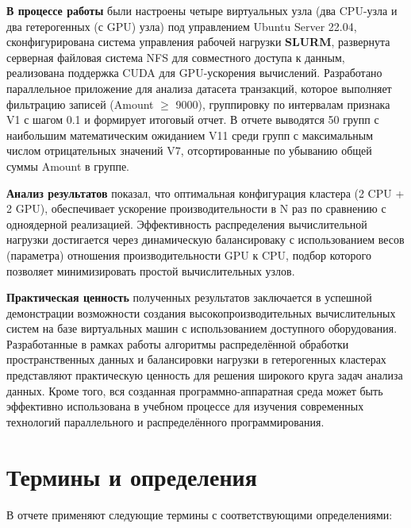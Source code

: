 \documentclass[areaset=advanced]{scrartcl}
\begin{document}
\textbf{В процессе работы} были настроены четыре виртуальных узла (два CPU-узла и два гетерогенных (с GPU) узла) под управлением Ubuntu Server 22.04,
сконфигурирована система управления рабочей нагрузки \textbf{SLURM}, развернута серверная файловая система NFS для совместного доступа к данным, реализована поддержка CUDA для GPU-ускорения
вычислений. Разработано параллельное приложение для анализа датасета транзакций, которое выполняет фильтрацию записей (Amount $\geq$ 9000), группировку по интервалам признака V1 с шагом 0.1 и формирует итоговый отчет. В отчете выводятся 50 групп с наибольшим математическим ожиданием V11 среди групп с максимальным числом отрицательных значений V7, отсортированные по убыванию общей суммы Amount в группе.

\textbf{Анализ результатов} показал, что оптимальная конфигурация кластера (2 CPU + 2 GPU), обеспечивает ускорение производительности в N раз по сравнению с одноядерной реализацией. 
Эффективность распределения вычислительной нагрузки достигается через динамическую балансироваку с использованием весов (параметра) отношения 
производительности GPU к CPU, подбор которого позволяет минимизировать простой вычислительных узлов.

\textbf{Практическая ценность} полученных результатов заключается в успешной демонстрации возможности создания высокопроизводительных вычислительных систем на базе виртуальных машин с использованием доступного оборудования. Разработанные в рамках работы алгоритмы распределённой обработки пространственных данных и балансировки нагрузки в гетерогенных кластерах представляют практическую ценность для решения широкого круга задач анализа данных. Кроме того, вся созданная программно-аппаратная среда может быть эффективно использована в учебном процессе для изучения современных технологий параллельного и распределённого программирования.

\newpage
	\tableofcontents
\newpage

\section*{Термины и определения}

В отчете применяют следующие термины с соответствующими определениями:
\end{document}

